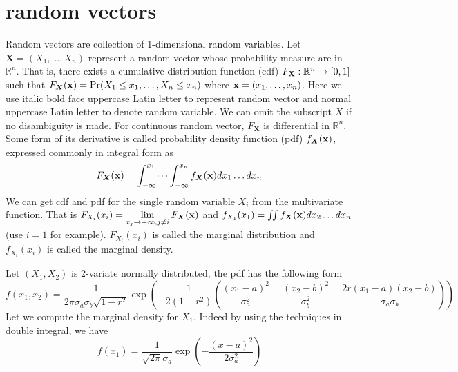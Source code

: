 \section{random vectors}
Random vectors are collection of 1-dimensional random variables. Let $\bm{X} = (X_1, \dots, X_n)$ 
represent a random vector whose probability measure are in $\mathbb{R}^n$.
That is, there exists a cumulative distribution function (cdf) $F_{\mathbf{X}}: \mathbb{R}^n \rightarrow [0,1]$ 
such that $F_{\bm{X}}(\mathbf{x}) = \Pr(X_1 \leq x_1, \dots, X_n \leq x_n)$ where $ \mathbf{x} = (x_1, \dots, x_n)$.
Here we use italic bold face uppercase Latin letter to represent random vector and normal uppercase Latin letter to denote random variable. We can omit the subscript $X$ if no disambiguity is made. For continuous random vector, $F_{\bm{X}}$ is differential in $\mathbb{R}^n$. Some form of its derivative is called probability density function (pdf) $f_{\bm{X}}(\mathbf{x})$, expressed commonly in integral form as
\begin{equation}
F_{\bm{X}}(\mathbf{x}) = \int_{-\infty}^{x_1}\dots\int_{-\infty}^{x_n} f_{\bm{X}}(\mathbf{x}) dx_1 \dots dx_n
\end{equation}
We can get cdf and pdf for the single random variable $X_i$ from the multivariate function. That is
$ F_{X_i}(x_i) = \displaystyle\lim_{x_j \to +\infty, j\neq i} F_{\bm{X}}(\mathbf{x})$ and 
$ f_{X_1}(x_1) = \iint f_{\bm{X}}(\mathbf{x})dx_2 \dots d x_n$ (use $i=1$ for example).
$F_{X_i}(x_i)$ is called the marginal distribution and $f_{X_i}(x_i)$ is called the marginal density.

\begin{example}
	Let $(X_1, X_2)$ is 2-variate normally distributed,  the pdf has the following form
\begin{equation}
f(x_1, x_2) = \frac{1}{2\pi \sigma_a \sigma_b \sqrt{1-r^2}} \exp(-\frac{1}{2(1-r^2)} \left(\frac{(x_1-a)^2}{\sigma_a^2} + \frac{(x_2-b)^2}{\sigma_b^2} -\frac{2r(x_1-a)(x_2-b)}{\sigma_a \sigma_b}\right)) 
\end{equation}
Let we compute the marginal density for $X_1$. Indeed by using the techniques in double integral, we have
\begin{equation}
f(x_1) = \frac{1}{\sqrt{2\pi}\sigma_a} \exp(-\frac{(x-a)^2}{2\sigma_a^2})
\end{equation}

\end{example}
